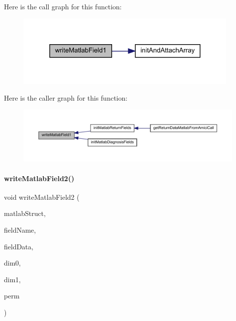 Here is the call graph for this function\+:
\nopagebreak
\begin{figure}[H]
\begin{center}
\leavevmode
\includegraphics[width=309pt]{namespaceamici_af4c7cca154fe6e21e8854e1308f1bef7_cgraph}
\end{center}
\end{figure}
Here is the caller graph for this function\+:
\nopagebreak
\begin{figure}[H]
\begin{center}
\leavevmode
\includegraphics[width=350pt]{namespaceamici_af4c7cca154fe6e21e8854e1308f1bef7_icgraph}
\end{center}
\end{figure}
\mbox{\label{namespaceamici_a0a2748c0e1bf95de52a2e2cf3450584e}} 
\paragraph{\texorpdfstring{write\+Matlab\+Field2()}{writeMatlabField2()}}
{\footnotesize\ttfamily void write\+Matlab\+Field2 (\begin{DoxyParamCaption}\item[{mx\+Array $\ast$}]{matlab\+Struct,  }\item[{const char $\ast$}]{field\+Name,  }\item[{std\+::vector$<$ T $>$}]{field\+Data,  }\item[{int}]{dim0,  }\item[{int}]{dim1,  }\item[{std\+::vector$<$ int $>$}]{perm }\end{DoxyParamCaption})}

